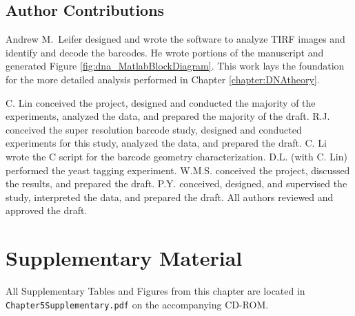 \subsection{Author Contributions}
Andrew M.~Leifer designed and wrote the software to analyze TIRF images and identify and decode the barcodes. He wrote portions of the manuscript and generated Figure \ref{fig:dna_MatlabBlockDiagram}. This work lays the foundation for the more detailed analysis performed in Chapter \ref{chapter:DNAtheory}.

C. Lin conceived the project, designed and conducted the majority of the experiments, 
analyzed the data, and prepared the majority of the draft. R.J. conceived the super 
resolution barcode study, designed and conducted experiments for this study, analyzed 
the data, and prepared the draft. C. Li wrote the C script for the barcode 
geometry characterization. D.L. (with C. Lin) performed the yeast tagging experiment. 
W.M.S. conceived the project, discussed the results, and prepared the draft. P.Y. 
conceived, designed, and supervised the study, interpreted the data, and prepared the 
draft. All authors reviewed and approved the draft. 


\section{Supplementary Material}
 All Supplementary Tables and Figures from this chapter are located in \texttt{Chapter5Supplementary.pdf} on the accompanying CD-ROM. 